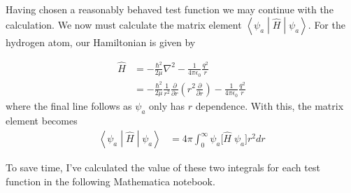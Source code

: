 \documentclass[a4paper, 11pt]{article}
\newcommand{\matrixel}[3]{\ensuremath{\left\langle #1 \middle| #2 \middle| #3 \right\rangle}}
\newenvironment{solution}{%
	\begin{list}{}{%
			\setlength{\topsep}{0pt}%
			\setlength{\leftmargin}{0.5cm}%
			\setlength{\rightmargin}{0.5cm}%
			\setlength{\listparindent}{\parindent}%
			\setlength{\itemindent}{\parindent}%
			\setlength{\parsep}{\parskip}%
		}%
		\item[]}{\end{list}}
\begin{document}
\begin{enumerate}[leftmargin=0em, label=\textbf{\arabic*}]
\begin{solution}
      Having chosen a reasonably behaved test function we may continue with the
      calculation. We now must calculate the matrix element
      $\matrixel{\psi_a}{\hat{H}}{\psi_a}$. For the hydrogen atom, our Hamiltonian is
      given by
      
      \begin{align}
        \hat{H} &= -\frac{\hbar^2}{2\mu}\nabla^2-\frac{1}{4\pi\epsilon_0}\frac{q^2}{r} \\
        &= -\frac{\hbar^2}{2\mu}\frac{1}{r^2}\frac{\partial}{\partial r}\left( r^2\frac{\partial}{\partial r} \right) - \frac{1}{4\pi\epsilon_0}\frac{q^2}{r}
      \end{align}
      where the final line follows as $\psi_a$ only has $r$ dependence. With
      this, the matrix element becomes
      \begin{align}
        \matrixel{\psi_a}{\hat{H}}{\psi_a} &= 4\pi \int_0^\infty \psi_a\Big[\hat{H}\; \psi_a \Big]r^2dr 
      \end{align}

      To save time, I've calculated the value of these two integrals for each
      test function in the following Mathematica notebook.
      
      


\end{solution}
\end{enumerate}
\end{document}
